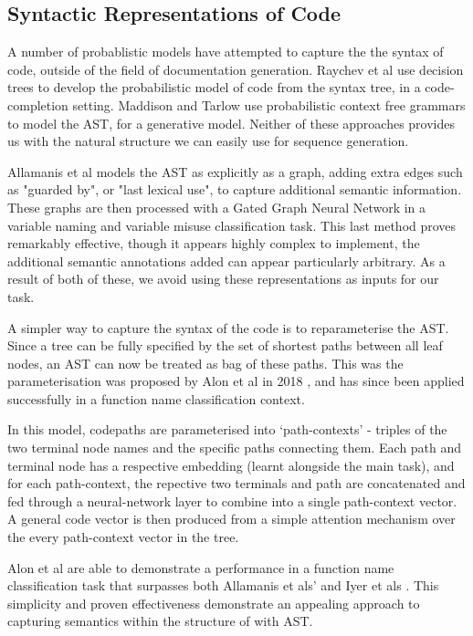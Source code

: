 \subsection{Syntactic Representations of Code}

A number of probablistic models have attempted to capture the the syntax of code, outside of the field of documentation generation.
Raychev et al \cite{raychev_probabilistic_nodate} use decision trees to develop the probabilistic model of code from the syntax tree, in a code-completion setting. 
Maddison and Tarlow \cite{maddison_structured_2014} use probabilistic context free grammars to model the AST, for a generative model. 
Neither of these approaches provides us with the natural structure we can easily use for sequence generation. 

Allamanis et al models the AST as explicitly as a graph, adding extra edges such as "guarded by", or "last lexical use", to capture additional semantic information\cite{allamanis_learning_2017}. These graphs are then processed with a Gated Graph Neural Network in a variable naming and variable misuse classification task. 
This last method proves remarkably effective, though it appears highly complex to implement, the additional semantic annotations added can appear particularly arbitrary. As a result of both of these, we avoid using these representations as inputs for our task.

A simpler way to capture the syntax of the code is to reparameterise the AST.
Since a tree can be fully specified by the set of shortest paths between all leaf nodes, an AST can now be treated as bag of these paths. This was the parameterisation was proposed by Alon et al in 2018 \cite{alon_general_2018}, and has since been applied successfully in a function name classification context\cite{alon_code2vec_2018}.

In this model, codepaths are parameterised into `path-contexts' - triples of the two terminal node names and the specific paths connecting them.
Each path and terminal node has a respective embedding (learnt alongside the main task), and for each path-context, the repective two terminals and path are concatenated and fed through a neural-network layer to combine into a single path-context vector.
A general code vector is then produced from a simple attention mechanism over the every path-context vector in the tree. 


Alon et al are able to demonstrate a performance in a function name classification task that surpasses both Allamanis et als' \cite{allamanis_convolutional_2016} and Iyer et als \cite{iyer_summarizing_2016}. This simplicity and proven effectiveness demonstrate an appealing approach to capturing semantics within the structure of with AST.

